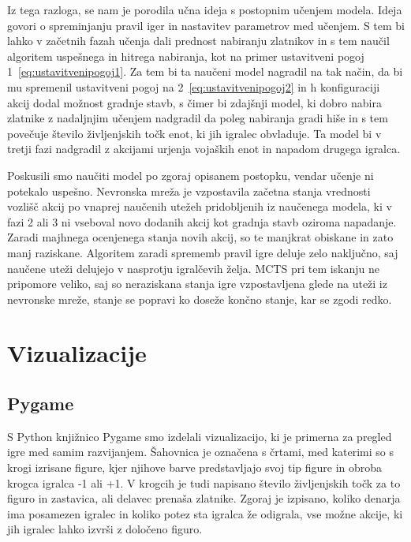\documentclass[a4paper, 12pt]{book}
\begin{document}
Iz tega razloga, se nam je porodila učna ideja s postopnim učenjem modela. 
Ideja govori o spreminjanju pravil iger in nastavitev parametrov med učenjem.
S tem bi lahko v začetnih fazah učenja dali prednost nabiranju zlatnikov in s tem naučil algoritem uspešnega in hitrega nabiranja, kot na primer ustavitveni pogoj 1~\ref{eq:ustavitvenipogoj1}.
Za tem bi ta naučeni model nagradil na tak način, da bi mu spremenil ustavitveni pogoj na 2~\ref{eq:ustavitvenipogoj2} in h konfiguraciji akcij dodal možnost gradnje stavb, s čimer bi zdajšnji model, ki dobro nabira zlatnike z nadaljnjim učenjem nadgradil da poleg nabiranja gradi hiše in s tem povečuje število življenjskih točk enot, ki jih igralec obvladuje.
Ta model bi v tretji fazi nadgradil z akcijami urjenja vojaških enot in napadom drugega igralca.

Poskusili smo naučiti model po zgoraj opisanem postopku, vendar učenje ni potekalo uspešno.
Nevronska mreža je vzpostavila začetna stanja vrednosti vozlišč akcij po vnaprej naučenih utežeh pridobljenih iz naučenega modela, ki v fazi 2 ali 3 ni vseboval novo dodanih akcij kot gradnja stavb oziroma napadanje.
Zaradi majhnega ocenjenega stanja novih akcij, so te manjkrat obiskane in zato manj raziskane.
Algoritem zaradi sprememb pravil igre deluje zelo naključno, saj naučene uteži delujejo v nasprotju igralčevih želja.
MCTS pri tem iskanju ne pripomore veliko, saj so neraziskana stanja igre vzpostavljena glede na uteži iz nevronske mreže, stanje se popravi ko doseže končno stanje, kar se zgodi redko.


\chapter{Vizualizacije}
\label{chvizualizacija}

\section{Pygame}
S Python knjižnico Pygame smo izdelali vizualizacijo, ki je primerna za pregled igre med samim razvijanjem. 
Šahovnica je označena s črtami, med katerimi so s krogi izrisane figure, kjer njihove barve predstavljajo svoj tip figure in obroba krogca igralca -1 ali +1.
V krogcih je tudi napisano število življenjskih točk za to figuro in zastavica, ali delavec prenaša zlatnike.
Zgoraj je izpisano, koliko denarja ima posamezen igralec in koliko potez sta igralca že odigrala, vse možne akcije, ki jih igralec lahko izvrši z določeno figuro.
\end{document}
